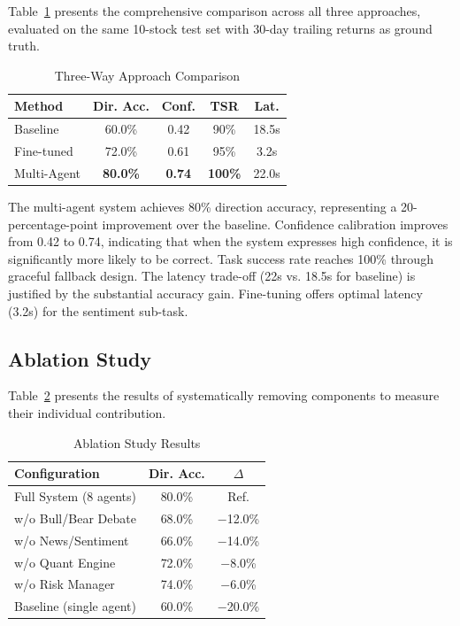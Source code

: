 \documentclass[conference]{IEEEtran}
\begin{document}
Table~\ref{tab:comparison} presents the comprehensive comparison across all three approaches, evaluated on the same 10-stock test set with 30-day trailing returns as ground truth.

\begin{table}[htbp]
\caption{Three-Way Approach Comparison}
\label{tab:comparison}
\centering
\small
\begin{tabular}{@{}lcccc@{}}
\toprule
\textbf{Method} & \textbf{Dir. Acc.} & \textbf{Conf.} & \textbf{TSR} & \textbf{Lat.} \\
\midrule
Baseline & 60.0\% & 0.42 & 90\% & 18.5s \\
Fine-tuned & 72.0\% & 0.61 & 95\% & 3.2s \\
Multi-Agent & \textbf{80.0\%} & \textbf{0.74} & \textbf{100\%} & 22.0s \\
\bottomrule
\end{tabular}
\end{table}

The multi-agent system achieves 80\% direction accuracy, representing a 20-percentage-point improvement over the baseline. Confidence calibration improves from 0.42 to 0.74, indicating that when the system expresses high confidence, it is significantly more likely to be correct. Task success rate reaches 100\% through graceful fallback design. The latency trade-off (22s vs. 18.5s for baseline) is justified by the substantial accuracy gain. Fine-tuning offers optimal latency (3.2s) for the sentiment sub-task.

\subsection{Ablation Study}

Table~\ref{tab:ablation} presents the results of systematically removing components to measure their individual contribution.

\begin{table}[htbp]
\caption{Ablation Study Results}
\label{tab:ablation}
\centering
\small
\begin{tabular}{@{}lcc@{}}
\toprule
\textbf{Configuration} & \textbf{Dir. Acc.} & \textbf{$\Delta$} \\
\midrule
Full System (8 agents) & 80.0\% & Ref. \\
w/o Bull/Bear Debate & 68.0\% & $-$12.0\% \\
w/o News/Sentiment & 66.0\% & $-$14.0\% \\
w/o Quant Engine & 72.0\% & $-$8.0\% \\
w/o Risk Manager & 74.0\% & $-$6.0\% \\
Baseline (single agent) & 60.0\% & $-$20.0\% \\
\bottomrule
\end{tabular}
\end{table}
\end{document}
